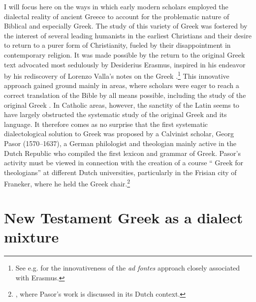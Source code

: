 I will focus here on the ways in which early modern scholars employed the dialectal reality of ancient Greece to account for the problematic nature of Biblical and especially  Greek. The study of this variety of Greek was fostered by the interest of several leading humanists in the earliest Christians and their desire to return to a purer form of Christianity, fueled by their disappointment in contemporary religion. It was made possible by the return to the original Greek text advocated most sedulously by Desiderius Erasmus, inspired in his endeavor by his rediscovery of Lorenzo Valla’s notes on the Greek .\footnote{See e.g. \citet[esp. 31]{Bentley1983} for the innovativeness of the \textit{ad fontes} approach closely associated with Erasmus.} This innovative approach gained ground mainly in  areas, where scholars were eager to reach a correct  translation of the Bible by all means possible, including the study of the original Greek . In Catholic areas, however, the sanctity of the Latin  seems to have largely obstructed the systematic study of the original Greek  and its language. It therefore comes as no surprise that the first systematic dialectological solution to  Greek was proposed by a Calvinist scholar, Georg Pasor (1570–1637), a German philologist and theologian mainly active in the Dutch Republic who compiled the first lexicon and grammar of  Greek. Pasor’s activity must be viewed in connection with the creation of a course “ Greek for theologians” at different Dutch universities, particularly in the Frisian city of Franeker, where he held the Greek chair.\footnote{, where Pasor’s work is discussed in its Dutch context.}

\section{New Testament Greek as a dialect mixture}\label{sec:4.5}

